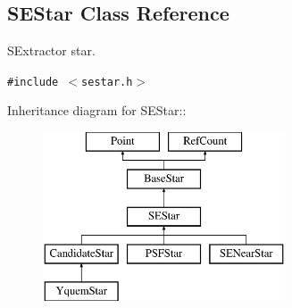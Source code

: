 \subsection{SEStar  Class Reference}
\label{class_sestar}
SExtractor star. 


{\tt \#include $<$sestar.h$>$}

Inheritance diagram for SEStar::\begin{figure}[H]
\begin{center}
\leavevmode
\includegraphics[height=5cm]{class_sestar}
\end{center}
\end{figure}

